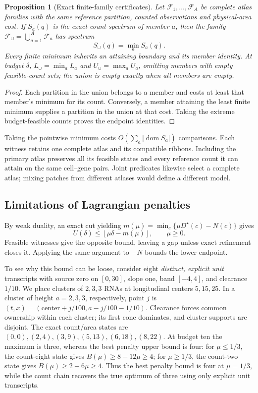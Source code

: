 \documentclass[10pt,letterpaper]{article}
\newtheorem{proposition}[theorem]{Proposition}
\begin{document}
\begin{proposition}[Exact finite-family certificates]\label{thm:union}
Let $\mathcal F_1,\ldots,\mathcal F_A$ be complete atlas families with the same reference partition, counted observations and physical-area cost. If $S_a(q)$ is the exact count spectrum of member $a$, then the family $\mathcal F_\cup=\bigcup_{a=1}^A\mathcal F_a$ has spectrum
\begin{equation}
 S_\cup(q)=\min_a S_a(q).\label{eq:union}
\end{equation}
Every finite minimum inherits an attaining boundary and its member identity. At budget $\delta$, $L_\cup=\min_a L_a$ and $U_\cup=\max_a U_a$, omitting members with empty feasible-count sets; the union is empty exactly when all members are empty.
\end{proposition}
\begin{proof}
Each partition in the union belongs to a member and costs at least that member's minimum for its count. Conversely, a member attaining the least finite minimum supplies a partition in the union at that cost. Taking the extreme budget-feasible counts proves the endpoint identities.
\end{proof}
Taking the pointwise minimum costs $O(\sum_a|\operatorname{dom}S_a|)$ comparisons. Each witness retains one complete atlas and its compatible ribbons. Including the primary atlas preserves all its feasible states and every reference count it can attain on the same cell--gene pairs. Joint predicates likewise select a complete atlas; mixing patches from different atlases would define a different model.

\subsection{Limitations of Lagrangian penalties}\label{sec:penalties}
By weak duality, an exact cut yielding $m(\mu)=\min_c\{\mu D^\star(c)-N(c)\}$ gives
\begin{equation}
U(\delta)\le\left\lfloor\mu\delta-m(\mu)\right\rfloor,\qquad\mu\ge0.\label{eq:dual}
\end{equation}
Feasible witnesses give the opposite bound, leaving a gap unless exact refinement closes it. Applying the same argument to $-N$ bounds the lower endpoint.

To see why this bound can be loose, consider eight \emph{distinct, explicit unit} transcripts with source zero on $[0,30]$, slope one, band $[-4,4]$, and clearance $1/10$. We place clusters of $2,3,3$ RNAs at longitudinal centers $5,15,25$. In a cluster of height $a=2,3,3$, respectively, point $j$ is $(t,x)=(\mathrm{center}+j/100,a-j/100-1/10)$. Clearance forces common ownership within each cluster; its first cone dominates, and cluster supports are disjoint. The exact count/area states are $(0,0),(2,4),(3,9),(5,13),(6,18),(8,22)$. At budget ten the maximum is three, whereas the best penalty upper bound is four: for $\mu\le1/3$, the count-eight state gives $B(\mu)\ge8-12\mu\ge4$; for $\mu\ge1/3$, the count-two state gives $B(\mu)\ge2+6\mu\ge4$. Thus the best penalty bound is four at $\mu=1/3$, while the count chain recovers the true optimum of three using only explicit unit transcripts.
\end{document}
